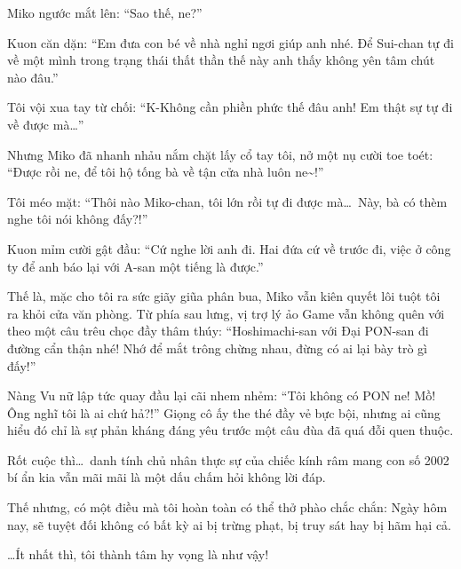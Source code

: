 \documentclass[../main.tex]{subfiles}
\begin{document}
Miko ngước mắt lên: ``Sao thế, ne?''

Kuon căn dặn: ``Em đưa con bé về nhà nghỉ ngơi giúp anh nhé. Để Sui-chan tự đi về một mình trong trạng thái thất thần thế này anh thấy không yên tâm chút nào đâu.''

Tôi vội xua tay từ chối: ``K-Không cần phiền phức thế đâu anh! Em thật sự tự đi về được mà\dots''

Nhưng Miko đã nhanh nhảu nắm chặt lấy cổ tay tôi, nở một nụ cười toe toét: ``Được rồi ne, để tôi hộ tống bà về tận cửa nhà luôn ne\~{}!''

Tôi méo mặt: ``Thôi nào Miko-chan, tôi lớn rồi tự đi được mà\dots\ Này, bà có thèm nghe tôi nói không đấy?!''

Kuon mỉm cười gật đầu: ``Cứ nghe lời anh đi. Hai đứa cứ về trước đi, việc ở công ty để anh báo lại với A-san một tiếng là được.''

Thế là, mặc cho tôi ra sức giãy giũa phân bua, Miko vẫn kiên quyết lôi tuột tôi ra khỏi cửa văn phòng. Từ phía sau lưng, vị trợ lý ảo Game vẫn không quên với theo một câu trêu chọc đầy thâm thúy: ``Hoshimachi-san với Đại PON-san đi đường cẩn thận nhé! Nhớ để mắt trông chừng nhau, đừng có ai lại bày trò gì đấy!''

Nàng Vu nữ lập tức quay đầu lại cãi nhem nhẻm: ``Tôi không có PON ne! Mồ! Ông nghĩ tôi là ai chứ hả?!'' Giọng cô ấy the thé đầy vẻ bực bội, nhưng ai cũng hiểu đó chỉ là sự phản kháng đáng yêu trước một câu đùa đã quá đỗi quen thuộc.

Rốt cuộc thì\dots\ danh tính chủ nhân thực sự của chiếc kính râm mang con số 2002 bí ẩn kia vẫn mãi mãi là một dấu chấm hỏi không lời đáp.

Thế nhưng, có một điều mà tôi hoàn toàn có thể thở phào chắc chắn: Ngày hôm nay, sẽ tuyệt đối không có bất kỳ ai bị trừng phạt, bị truy sát hay bị hãm hại cả.

\dots Ít nhất thì, tôi thành tâm hy vọng là như vậy!
\end{document}
